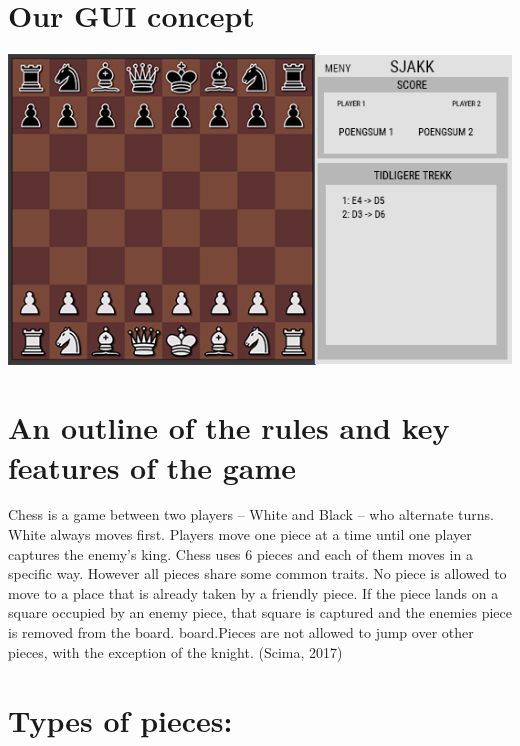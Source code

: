 \documentclass{article}
\begin{document}
    \section{Our GUI concept}
    \begin{center}
        \includegraphics[scale=0.6]{mockup_chess.png}
    \end{center}

    
    
    \section{An outline of the rules and key features of the game}
    \noindent
    Chess is a game between two players  -- White and Black -- who alternate turns. White always moves first. Players move one piece at a time until one player captures the enemy's king.  Chess uses 6 pieces and each of them moves in a specific way. However all pieces share some common traits. No piece is allowed to move to a place that is already taken by a friendly piece. If the piece lands on a square occupied by an enemy piece, that square is captured and the enemies piece is removed from the board. board.Pieces are not allowed to jump over other pieces, with the exception of the knight. (Scima, 2017)

\section{Types of pieces:}
\end{document}
